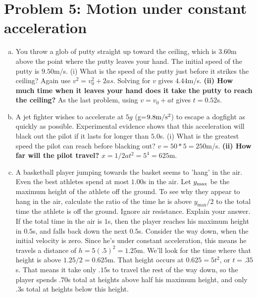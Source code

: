 \documentclass[10pt,letter]{article}
\begin{document}
\section*{Problem 5: Motion under constant acceleration}
\begin{enumerate}[(a)]
\item {\rm You throw a glob of putty straight up toward the ceiling, which is $3.60$m above the point where the putty leaves your hand. The initial speed of the putty is $9.50$m/s. (i) What is the speed of the putty just before it strikes the ceiling?}
Again use $v^2 = v_0^2 + 2as$. Solving for $v$ gives $4.44$m/s.  
{\bf (ii) How much time when it leaves your hand does it take the putty to reach the ceiling?}
As the last problem, using $v = v_0 + at$ gives $t = 0.52$s.
\item {\rm A jet fighter wishes to accelerate at $5g$ (g=$9.8 {\rm m}/{\rm s}^2$) to escape a dogfight as quickly as possible. Experimental evidence shows that this acceleration will black out the pilot if it lasts for longer than $5.0$s. (i) What is the greatest speed the pilot can reach before blacking out?}
$v = 50 * 5 = 250$m/s. {\bf (ii) How far will the pilot travel?} $x = 1/2 a t^2 = 5^4 = 625$m.
\item {\rm A basketball player jumping towards the basket seems to 'hang' in the air. Even the best athletes spend at most $1.00$s in the air. Let $y_{\rm max}$ be the maximum height of the athlete off the ground. To see why they appear to hang in the air, calculate the ratio of the time he is above $y_{\max}/2$ to the total time the athlete is off the ground. Ignore air resistance. Explain your answer.}
If the total time in the air is $1$s, then the player reaches his maximum height in $0.5$s, and falls back down the next $0.5$s. Consider the way down, when the initial velocity is zero. Since he's under constant acceleration, this means he travels a distance of $h = 5 (.5)^2 = 1.25$m. We'll look for the time where that height is above $1.25/2 = 0.625$m. That height occurs at $0.625 = 5 t^2$, or $t = .35$s. That means it take only $.15$s to travel the rest of the way down, so the player spends $.70$s total at heights above half his maximum height, and only $.3$s total at heights below this height.
\end{enumerate}
\end{document}
